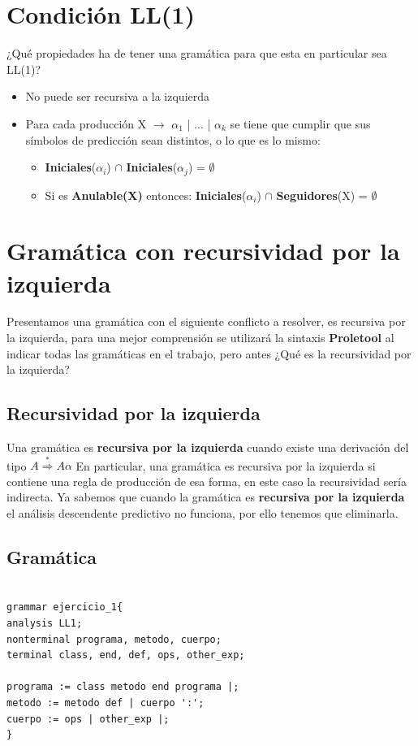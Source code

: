 \clearpage
\section{Condición LL(1)}
\label{sec:ll1}
¿Qué propiedades ha de tener una gramática para que esta en particular sea LL(1)?
\begin{itemize}
	\item No puede ser recursiva a la izquierda
	\item Para cada producción X $\longrightarrow$ $\alpha_1$ | ... | $\alpha_k$ se tiene que cumplir que sus símbolos de predicción sean distintos, o lo que es lo mismo: \begin{itemize}
		\item  \textbf{Iniciales}($\alpha_i$) $\cap$ \textbf{Iniciales}($\alpha_j$) = $\emptyset$
		\item Si es \textbf{Anulable(X)} entonces:  \textbf{Iniciales}($\alpha_i$) $\cap$ \textbf{Seguidores}(X) = $\emptyset$
	\end{itemize}
	
\end{itemize}

\section{Gramática con recursividad por la izquierda}
\label{sec:hello}
Presentamos una gramática con el siguiente conflicto a resolver, es recursiva por la izquierda, para una mejor comprensión se utilizará la sintaxis \textbf{Proletool} \cite{Proletool} al indicar todas las gramáticas en el trabajo, pero antes ¿Qué es la recursividad por la izquierda?
\subsection{Recursividad por la izquierda}
Una gramática es \textbf{recursiva por la izquierda} cuando existe una derivación del tipo  $A \stackrel{*}{\Longrightarrow} A \alpha$
\newline
\newline
En particular, una gramática es recursiva por la izquierda si contiene una regla de producción de esa forma, en este caso la recursividad sería indirecta.
\newline
\newline
Ya sabemos que cuando la gramática es \textbf{recursiva por la izquierda} el análisis descendente predictivo no funciona, por ello tenemos que eliminarla.
\newline
\newline
\subsection{Gramática}
\begin{lstlisting}[caption = Gramática recursiva a la izquierda, style= Python]

grammar ejercicio_1{
analysis LL1;
nonterminal programa, metodo, cuerpo;
terminal class, end, def, ops, other_exp;

programa := class metodo end programa |;
metodo := metodo def | cuerpo ':';
cuerpo := ops | other_exp |;
}


\end{lstlisting}
